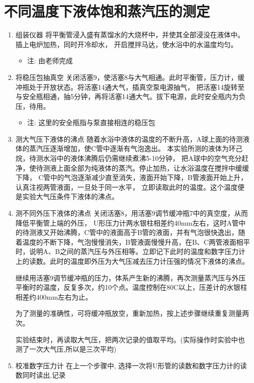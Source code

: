 \documentclass[11pt]{report}
\begin{document}
\section{不同温度下液体饱和蒸汽压的测定}
\label{sec:org7231b12}
\begin{enumerate}
\item 组装仪器
\label{sec:org049d710}
将平衡管浸入盛有蒸馏水的大烧杯中，并使其全部浸没在液体中。插上电炉加热，同时开冷却水，
开启搅拌马达，使水浴中的水温度均匀。
\begin{itemize}
\item 注: 由老师完成
\end{itemize}
\item 将稳压包抽真空
\label{sec:orgd45eb66}
关闭活塞9，使活塞8与大气相通。此时平衡管，压力计，缓冲瓶处于开放状态。将活塞14通大气，插真空泵电源抽气，
把活塞14旋转至与安全瓶相通，抽5分钟，再将活塞14通大气。拔下电源，此时安全瓶内为负压，待用。
\begin{itemize}
\item 注: 这里的安全瓶指与泵直接相连的稳压包
\end{itemize}
\item 测大气压下液体的沸点
\label{sec:org4b4dee3}
随着水浴中液体的温度的不断升高，A球上面的待测液体的蒸汽压逐渐增加，使C管中逐渐有气泡逸出。
本实验所测的液体为环己烷，待测水浴中的液体沸腾后仍需继续煮沸5-10分钟，
把A球中的空气充分赶净，使待测液上面全部为纯液体的蒸汽。停止加热，让水浴温度在搅拌中缓缓下降，
C管中的气泡逐渐减少直至消失，液面开始下降，B管液面开始上升，认真注视两管液面，一旦处于同一水平，
立即读取此时的温度。这个温度便是实验大气压条件下液体的沸点。
\item 测不同外压下液体的沸点
\label{sec:org56d27ec}
关闭活塞8，用活塞9调节缓冲瓶7中的真空度，从而降低平衡管上端的外压，
U形压力计两水银柱相差约40mm左右，这时A管中的待测液又开始沸腾，C管中的液面高于B管的液面，并有气泡很快逸出，随着温度的不断下降，气泡慢慢消失，B管液面慢慢升高，在B、C两管液面相平时，说明A、B之间的蒸汽压与外压相等。立即记下此时的温度和数字压力计上的读数。此时的温度即外压为大气压减去压力计压强的情况下液体的沸点。

继续用活塞9调节缓冲瓶的压力，体系产生新的沸腾，再次测量蒸汽压与外压平衡时的温度，反复多次，约10个点。温度控制在80C以上，压差计的水银柱相差约400mm左右为止。

为了测量的准确性，可将缓冲瓶放空，重新加热，按上述步骤继续重复测量两次。

实验结束时，再读取大气压，把两次记录的值取平均。(实际操作时实验中也测了一次大气压,所以是三次平均)
\item 校准数字压力计
\label{sec:orgd5d6df2}
在上一个步骤中, 选择一次将U形管的读数和数字压力计的读数同时读出,记录
\end{enumerate}
\end{document}
